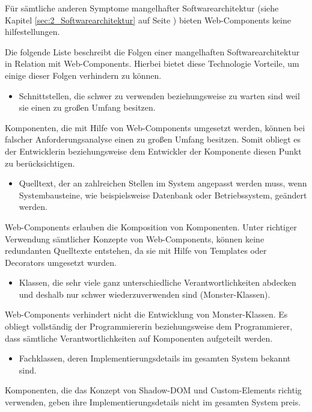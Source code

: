 Für sämtliche anderen Symptome mangelhafter Softwarearchitektur (siehe Kapitel \ref{sec:2_Softwarearchitektur} auf Seite \pageref{sec:2_Softwarearchitektur}) bieten Web-Components keine hilfestellungen.

Die folgende Liste beschreibt die Folgen einer mangelhaften Softwarearchitektur in Relation mit Web-Components. Hierbei bietet diese Technologie Vorteile, um einige dieser Folgen verhindern zu können.

\begin{itemize}
\item Schnittstellen, die schwer zu verwenden beziehungsweise zu warten sind weil sie einen zu großen Umfang besitzen.
\end{itemize}
Komponenten, die mit Hilfe von Web-Components umgesetzt werden, können bei falscher Anforderungsanalyse einen zu großen Umfang besitzen. Somit obliegt es der Entwicklerin beziehungsweise dem Entwickler der Komponente diesen Punkt zu berücksichtigen.

\begin{itemize}
\item Quelltext, der an zahlreichen Stellen im System angepasst werden muss, wenn Systembausteine, wie beispielsweise Datenbank oder Betriebssystem, geändert werden.
\end{itemize}
Web-Components erlauben die Komposition von Komponenten. Unter richtiger Verwendung sämtlicher Konzepte von Web-Components, können keine redundanten Quelltexte entstehen, da sie mit Hilfe von Templates oder Decorators umgesetzt wurden.

\begin{itemize}
\item Klassen, die sehr viele ganz unterschiedliche Verantwortlichkeiten abdecken und deshalb nur schwer wiederzuverwenden sind (\glqq Monster\grqq -Klassen).
\end{itemize}
Web-Components verhindert nicht die Entwicklung von \glqq Monster\grqq -Klassen. Es obliegt vollständig der Programmiererin beziehungsweise dem Programmierer, dass sämtliche Verantwortlichkeiten auf Komponenten aufgeteilt werden.

\begin{itemize}
\item Fachklassen, deren Implementierungsdetails im gesamten System bekannt sind.
\end{itemize}
Komponenten, die das Konzept von Shadow-DOM und Custom-Elements richtig verwenden, geben ihre Implementierungsdetails nicht im gesamten System preis.

